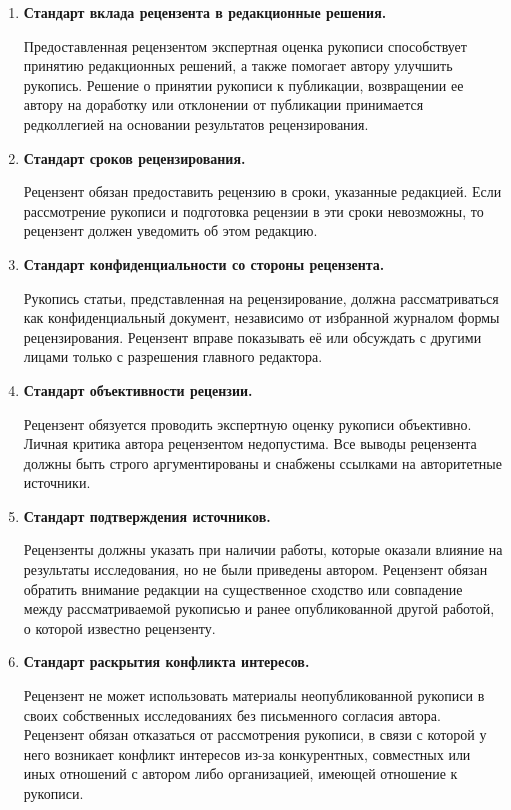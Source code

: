 \begin{enumerate}

\item[\bf 4.1.] {\bf Стандарт вклада рецензента в редакционные решения.}

Предоставленная рецензентом экспертная оценка рукописи способствует принятию редакционных решений, а также помогает автору улучшить рукопись. Решение о принятии рукописи к публикации, возвращении ее автору на доработку или отклонении от публикации принимается редколлегией на основании результатов рецензирования.



\item[\bf 4.2.] {\bf Стандарт сроков рецензирования.}

Рецензент обязан предоставить рецензию в сроки, указанные редакцией. Если рассмотрение рукописи и подготовка рецензии в эти сроки невозможны, то рецензент должен уведомить об этом редакцию.



\item[\bf 4.3.] {\bf Стандарт конфиденциальности со стороны рецензента.}

Рукопись статьи, представленная на рецензирование, должна рассматриваться как конфиденциальный документ, независимо от избранной журналом формы рецензирования. Рецензент вправе показывать её или обсуждать с другими лицами только с разрешения главного редактора.

\item[\bf 4.4.] {\bf  Стандарт объективности рецензии.}

Рецензент обязуется проводить экспертную оценку рукописи объективно. Личная критика автора рецензентом недопустима. Все выводы рецензента должны быть строго аргументированы и снабжены ссылками на авторитетные источники.



\item[\bf 4.5.] {\bf  Стандарт подтверждения источников.}

Рецензенты должны указать при наличии работы, которые оказали влияние на результаты исследования, но не были приведены автором. Рецензент обязан обратить внимание редакции на существенное сходство или совпадение между рассматриваемой рукописью и ранее опубликованной другой работой, о которой известно рецензенту.



\item[\bf 4.6.] {\bf  Стандарт раскрытия конфликта интересов.}

Рецензент не может использовать материалы неопубликованной рукописи в своих собственных исследованиях без письменного согласия автора. Рецензент обязан отказаться от рассмотрения рукописи, в связи с которой у него возникает конфликт интересов из-за конкурентных, совместных или иных отношений с автором либо организацией, имеющей отношение к рукописи. 



\end{enumerate}



